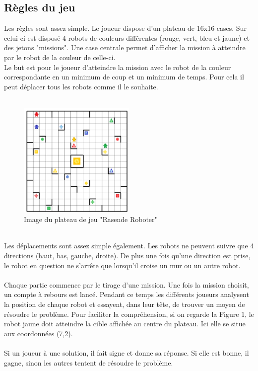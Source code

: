 \documentclass{article}
\begin{document}
\subsection{Règles du jeu}
Les règles sont assez simple. Le joueur dispose d'un plateau de 16x16 cases. Sur celui-ci est disposé 4 robots de couleurs différentes (rouge, vert, bleu et jaune) et des jetons "missions". Une case centrale permet d'afficher la mission à atteindre par le robot de la couleur de celle-ci.\\ Le but est pour le joueur d'atteindre la mission avec le robot de la couleur correspondante en un minimum de coup et un minimum de temps. Pour cela il peut déplacer tous les robots comme il le souhaite.\\\\
\begin{figure}[h]
  \centering  
  \includegraphics[width=0.5\textwidth]{map_rasende.png}  
  \caption{Image du plateau de jeu "Rasende Roboter"} 
  \label{fig:Plateau}  
\end{figure}
\\
Les déplacements sont assez simple également. Les robots ne peuvent suivre que 4 directions (haut, bas, gauche, droite). De plus une fois qu'une direction est prise, le robot en question ne s'arrête que lorsqu'il croise un mur ou un autre robot.\\\\Chaque partie commence par le tirage d'une mission. Une fois la mission choisit, un compte à rebours est lancé. Pendant ce temps les différents joueurs analysent la position de chaque robot et essayent, dans leur tête, de trouver un moyen de résoudre le problème. Pour faciliter la compréhension, si on regarde la Figure 1, le robot jaune doit atteindre la cible affichée au centre du plateau. Ici elle se situe aux coordonnées (7,2).\\\\
Si un joueur à une solution, il fait signe et donne sa réponse. Si elle est bonne, il gagne, sinon les autres tentent de résoudre le problème.
\end{document}
